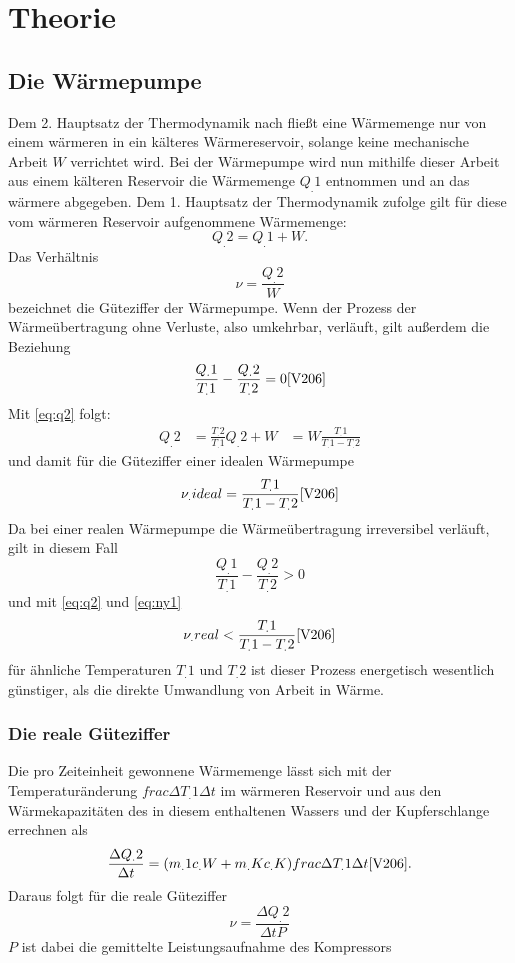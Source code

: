\section{Theorie}
\subsection{Die Wärmepumpe}
Dem 2. Hauptsatz der Thermodynamik nach fließt eine Wärmemenge nur von  einem  wärmeren in ein kälteres Wärmereservoir, solange keine mechanische Arbeit $W$ verrichtet wird.
Bei der Wärmepumpe wird nun mithilfe dieser Arbeit aus einem kälteren Reservoir die Wärmemenge $Q_.{1}$ entnommen und an das wärmere abgegeben. Dem 1. Hauptsatz der Thermodynamik zufolge gilt für diese vom wärmeren Reservoir aufgenommene Wärmemenge: \begin{equation}
Q_.{2} = Q_.{1} + W. \label{eq:q2}
\end{equation}
Das Verhältnis 
\begin{equation}
\nu = \frac{Q_.{2}}{W} \label{eq:ny1}
\end{equation}
bezeichnet die Güteziffer der Wärmepumpe.
Wenn der Prozess der Wärmeübertragung ohne Verluste, also umkehrbar, verläuft, gilt außerdem die Beziehung
\begin{equation}
\frac{Q_.{1}}{T_.{1}}-\frac{Q_.{2}}{T_.{2}} = 0 \cite{V206}
\end{equation}
Mit \eqref{eq:q2} folgt:
\begin{align*}
Q_.{2} &= \frac{T_.{2}}{T_.{1}}Q_.{2} + W
	   &= W \frac{T_.{1}}{T_.{1}-T_.{2}}
\end{align*}
und damit für die Güteziffer einer idealen Wärmepumpe
\begin{equation*}
\nu_.{ideal} = \frac{T_.{1}}{T_.{1}-T_.{2}} \cite{V206}
\end{equation*}
Da bei einer realen Wärmepumpe die Wärmeübertragung irreversibel verläuft, gilt in diesem Fall
\begin{equation}
\frac{Q_.{1}}{T_.{1}}-\frac{Q_.{2}}{T_.{2}} > 0 \label{eq:diffreal}
\end{equation}
und mit \eqref{eq:q2} und \eqref{eq:ny1}
\begin{equation}
\nu_.{real} < \frac{T_.{1}}{T_.{1}-T_.{2}} \label{eq:nyreal} \cite{V206}
\end{equation}
für ähnliche Temperaturen $T_.{1}$ und $T_.{2}$ ist dieser Prozess energetisch wesentlich günstiger, als die direkte Umwandlung von Arbeit in Wärme.
\subsubsection{Die reale Güteziffer}
Die pro Zeiteinheit gewonnene Wärmemenge lässt sich mit der Temperaturänderung $frac{\Delta T_.{1}}{\Delta t}$ im wärmeren Reservoir und aus den Wärmekapazitäten des in diesem enthaltenen Wassers und der Kupferschlange errechnen als
\[\frac{\Delta Q_.{2}}{\Delta t}=(m_.{1}c_.{W} +m_.{K}c_.{K})frac{\Delta T_.{1}}{\Delta t}\cite{V206}.\]
Daraus folgt für die reale Güteziffer
\begin{equation}
\nu = \frac{\Delta Q_.{2}}{\Delta t P}\label{eq:ny}
\end{equation}
$P$ ist dabei die gemittelte Leistungsaufnahme des Kompressors \cite{V206}
